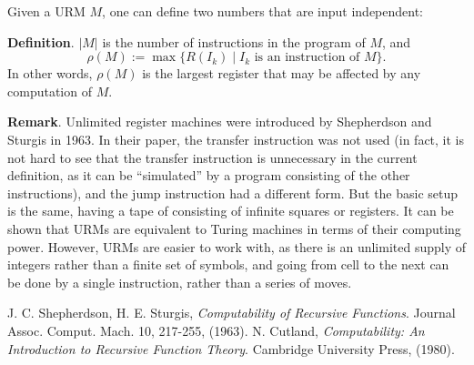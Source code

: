 \documentclass[12pt]{article}
\begin{document}
Given a URM $M$, one can define two numbers that are input independent: 

\textbf{Definition}.  $|M|$ is the number of instructions in the program of $M$, and $$\rho(M):=\max \lbrace R(I_k) \mid I_k \mbox{ is an instruction of }M \rbrace.$$  In other words, $\rho(M)$ is the largest register that may be affected by any computation of $M$.

\textbf{Remark}.  Unlimited register machines were introduced by Shepherdson and Sturgis in 1963.  In their paper, the transfer instruction was not used (in fact, it is not hard to see that the transfer instruction is unnecessary in the current definition, as it can be ``simulated'' by a program consisting of the other instructions), and the jump instruction had a different form.  But the basic setup is the same, having a tape of consisting of infinite squares or registers.  It can be shown that URMs are equivalent to Turing machines in terms of their computing power.  However, URMs are easier to work with, as there is an unlimited supply of integers rather than a finite set of symbols, and going from cell to the next can be done by a single instruction, rather than a series of moves.

\begin{thebibliography}{9}
 J. C. Shepherdson, H. E. Sturgis, {\em Computability of Recursive Functions}. Journal Assoc. Comput. Mach. 10, 217-255, (1963).
 N. Cutland, {\em Computability: An Introduction to Recursive Function Theory}. Cambridge University Press, (1980).
\end{thebibliography}
\end{document}
